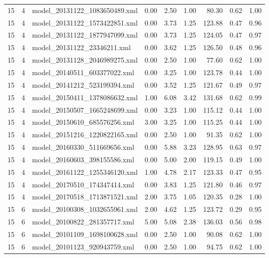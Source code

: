 \begin{table}[ht]
\begin{tabular}{rrlrrrrrr}
   15 &   4 & model\_20131122\_1083650489.xml & 0.00 & 2.50 & 1.00 & 80.30 & 0.62 & 1.00 \\ 
   15 &   4 & model\_20131122\_1573422851.xml & 0.00 & 3.73 & 1.25 & 123.88 & 0.47 & 0.96 \\ 
   15 &   4 & model\_20131122\_1877947099.xml & 0.00 & 3.73 & 1.25 & 124.05 & 0.47 & 0.97 \\ 
   15 &   4 & model\_20131122\_23346211.xml & 0.00 & 3.62 & 1.25 & 126.50 & 0.48 & 0.96 \\ 
   15 &   4 & model\_20131128\_2046989275.xml & 0.00 & 2.50 & 1.00 & 77.60 & 0.62 & 1.00 \\ 
   15 &   4 & model\_20140511\_603377022.xml & 0.00 & 3.25 & 1.00 & 123.78 & 0.44 & 1.00 \\ 
   15 &   4 & model\_20141212\_523199394.xml & 0.00 & 3.52 & 1.25 & 121.67 & 0.49 & 0.97 \\ 
   15 &   4 & model\_20150411\_1378086632.xml & 1.00 & 6.08 & 3.42 & 131.68 & 0.62 & 0.99 \\ 
   15 &   4 & model\_20150507\_1665248699.xml & 0.00 & 3.23 & 1.00 & 115.12 & 0.44 & 1.00 \\ 
   15 &   4 & model\_20150610\_685576256.xml & 3.00 & 3.25 & 1.00 & 115.25 & 0.44 & 1.00 \\ 
   15 &   4 & model\_20151216\_1220822165.xml & 0.00 & 2.50 & 1.00 & 91.35 & 0.62 & 1.00 \\ 
   15 &   4 & model\_20160330\_511669656.xml & 0.00 & 5.88 & 3.23 & 128.95 & 0.63 & 0.97 \\ 
   15 &   4 & model\_20160603\_398155586.xml & 0.00 & 5.00 & 2.00 & 119.15 & 0.49 & 1.00 \\ 
   15 &   4 & model\_20161122\_1255346120.xml & 1.00 & 4.78 & 2.17 & 123.33 & 0.47 & 0.95 \\ 
   15 &   4 & model\_20170510\_174347414.xml & 0.00 & 3.83 & 1.25 & 121.80 & 0.46 & 0.97 \\ 
   15 &   4 & model\_20170518\_1713871521.xml & 2.00 & 3.75 & 1.05 & 120.35 & 0.28 & 1.00 \\ 
   15 &   6 & model\_20100308\_1032655961.xml & 2.00 & 4.62 & 1.25 & 123.72 & 0.29 & 0.95 \\ 
   15 &   6 & model\_20100822\_281357717.xml & 5.00 & 5.08 & 2.38 & 136.03 & 0.56 & 0.98 \\ 
   15 &   6 & model\_20101109\_1698100628.xml & 0.00 & 2.50 & 1.00 & 90.08 & 0.62 & 1.00 \\ 
   15 &   6 & model\_20101123\_920943759.xml & 0.00 & 2.50 & 1.00 & 94.75 & 0.62 & 1.00 \\ 

\end{tabular}
\end{table}
